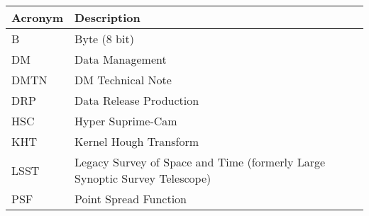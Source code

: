 \addtocounter{table}{-1}
\begin{longtable}{p{}p{}}\hline
\textbf{Acronym} & \textbf{Description}  \\\hline

B & Byte (8 bit) \\\hline
DM & Data Management \\\hline
DMTN & DM Technical Note \\\hline
DRP & Data Release Production \\\hline
HSC & Hyper Suprime-Cam \\\hline
KHT & Kernel Hough Transform \\\hline
LSST & Legacy Survey of Space and Time (formerly Large Synoptic Survey Telescope) \\\hline
PSF & Point Spread Function \\\hline
\end{longtable}
